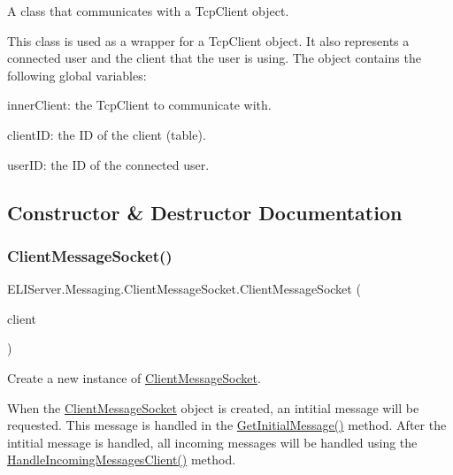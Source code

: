 A class that communicates with a Tcp\+Client object.

This class is used as a wrapper for a Tcp\+Client object. It also represents a connected user and the client that the user is using. The object contains the following global variables\+:
\begin{DoxyItemize}
\item inner\+Client\+: the Tcp\+Client to communicate with.
\item client\+ID\+: the ID of the client (table).
\item user\+ID\+: the ID of the connected user. 
\end{DoxyItemize}

\subsection{Constructor \& Destructor Documentation}
\mbox{\label{class_e_l_i_server_1_1_messaging_1_1_client_message_socket_ae2c5fabcf44e180e767e22dbbe797174}} 
\subsubsection{\texorpdfstring{Client\+Message\+Socket()}{ClientMessageSocket()}}
{\footnotesize\ttfamily E\+L\+I\+Server.\+Messaging.\+Client\+Message\+Socket.\+Client\+Message\+Socket (\begin{DoxyParamCaption}\item[{Tcp\+Client}]{client }\end{DoxyParamCaption})\hspace{0.3cm}{\ttfamily [inline]}}





Create a new instance of \hyperlink{class_e_l_i_server_1_1_messaging_1_1_client_message_socket}{Client\+Message\+Socket}.

When the \hyperlink{class_e_l_i_server_1_1_messaging_1_1_client_message_socket}{Client\+Message\+Socket} object is created, an intitial message will be requested. This message is handled in the \hyperlink{class_e_l_i_server_1_1_messaging_1_1_client_message_socket_ae337f033eec166081fc56f6a35a22c8f}{Get\+Initial\+Message()} method. After the intitial message is handled, all incoming messages will be handled using the \hyperlink{class_e_l_i_server_1_1_messaging_1_1_client_message_socket_a3d83f53c3a99a74cc67092265a9d75ea}{Handle\+Incoming\+Messages\+Client()} method. 


